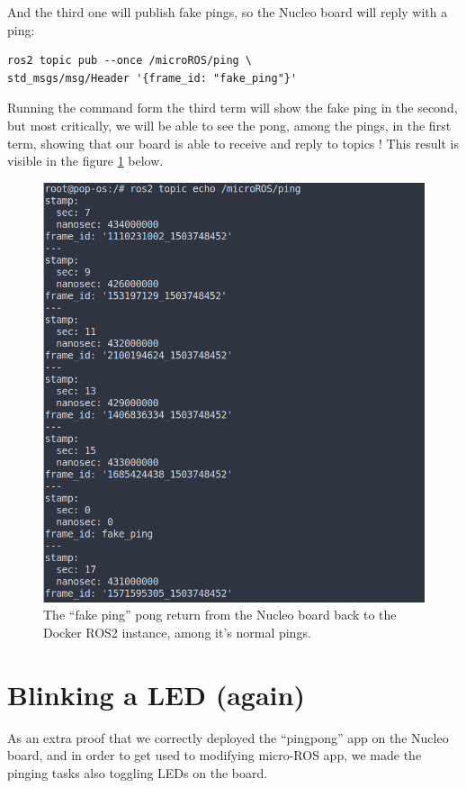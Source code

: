 \documentclass[10pt]{article}
\begin{document}
And the third one will publish fake pings, so the Nucleo board will reply with a ping:
\begin{tcolorbox}
\begin{verbatim}
ros2 topic pub --once /microROS/ping \
std_msgs/msg/Header '{frame_id: "fake_ping"}'
\end{verbatim}
\end{tcolorbox}

Running the command form the third term will show the fake ping in the second, but most critically, we will be able to see the pong, among the pings, in the first term, showing that our board is able to receive and reply to topics ! This result is visible in the figure \ref{fig:pingpong} below.


\begin{figure}[!h]
  \centering
  \includegraphics[width=.9\textwidth]{./img/pingpong.png}
  \caption{The ``fake ping'' pong return from the Nucleo board back to the Docker ROS2 instance, among it's normal pings.}
  \label{fig:pingpong}
\end{figure}


\section{Blinking a LED (again)}
\label{sec:blinking-led-again}
As an extra proof that we correctly deployed the ``pingpong'' app on the Nucleo board, and in order to get used to modifying micro-ROS app, we made the pinging tasks also toggling LEDs on the board.\\
\end{document}
